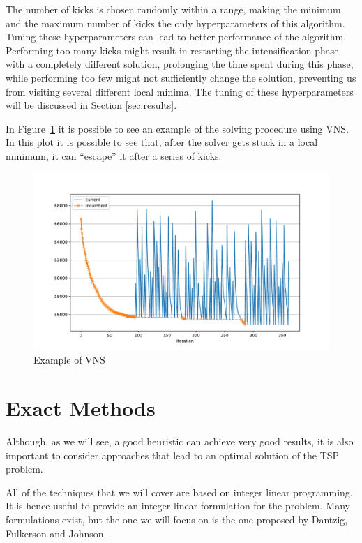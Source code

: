 \documentclass{article}
\begin{document}
The number of kicks is chosen randomly within a range, making the minimum and the maximum number
of kicks the only hyperparameters of this algorithm.
Tuning these hyperparameters can lead to better performance of the algorithm. Performing too many
kicks might result in restarting the intensification phase with a completely different solution,
prolonging the time spent during this phase, while performing
too few might not sufficiently change the solution, preventing us from visiting several different local minima.
The tuning of these hyperparameters will be discussed in Section \ref{sec:results}.

In Figure~\ref{fig:vns} it is possible to see an example of the solving procedure
using VNS. In this plot it is possible to see that, after the solver gets
stuck in a local minimum, it can ``escape'' it after a series of kicks.

\begin{figure}[ht]
        \caption{Example of VNS}
        \label{fig:vns}
        \centering
        \includegraphics[width=400pt]{assets/vns.pdf}
\end{figure}

\clearpage

\section{Exact Methods}
Although, as we will see, a good heuristic can achieve very good results, it is also
important to consider approaches that lead to an optimal solution of the
TSP problem.

All of the techniques that we will cover are based on integer linear programming. It is
hence useful to provide an integer linear formulation for the problem.
Many formulations exist, but the one we will focus on is the one proposed by
Dantzig, Fulkerson and Johnson~\cite{dantzig1954solution}.
\end{document}
